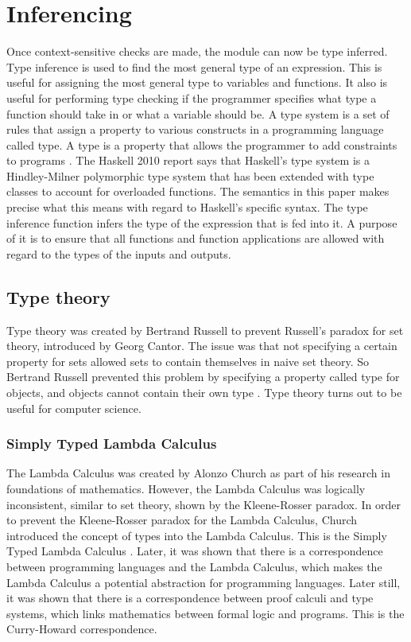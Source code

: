 \chapter{Inferencing}
Once context-sensitive checks are made, the module can now be type inferred. Type inference is used to find the most general type of an expression. This is useful for assigning the most general type to variables and functions. It also is useful for performing type checking if the programmer specifies what type a function should take in or what a variable should be.
A type system is a set of rules that assign a property to various constructs in a programming language called type. A type is a property that allows the programmer to add constraints to programs \cite{Type:Type}.
The Haskell 2010 report says that Haskell's type system is a Hindley-Milner polymorphic type system \cite{TypeSystem:Hindley, TypeSystem:Milner} that has been extended with type classes to account for overloaded functions. The semantics in this paper makes precise what this means with regard to Haskell's specific syntax.
The type inference function infers the type of the expression that is fed into it. A purpose of it is to ensure that all functions and function applications are allowed with regard to the types of the inputs and outputs.

\section{Type theory}
Type theory was created by Bertrand Russell to prevent Russell's paradox for set theory, introduced by Georg Cantor. The issue was that not specifying a certain property for sets allowed sets to contain themselves in naive set theory. So Bertrand Russell prevented this problem by specifying a property called type for objects, and objects cannot contain their own type \cite{Stanford:TypeTheory}.
Type theory turns out to be useful for computer science.

\subsection{Simply Typed Lambda Calculus}
The Lambda Calculus was created by Alonzo Church as part of his research in foundations of mathematics. However, the Lambda Calculus was logically inconsistent, similar to set theory, shown by the Kleene-Rosser paradox.
In order to prevent the Kleene-Rosser paradox for the Lambda Calculus, Church introduced the concept of types into the Lambda Calculus. This is the Simply Typed Lambda Calculus \cite{TypeSystem:Simple}.
Later, it was shown that there is a correspondence between programming languages and the Lambda Calculus, which makes the Lambda Calculus a potential abstraction for programming languages.
Later still, it was shown that there is a correspondence between proof calculi and type systems, which links mathematics between formal logic and programs. This is the Curry-Howard correspondence.

